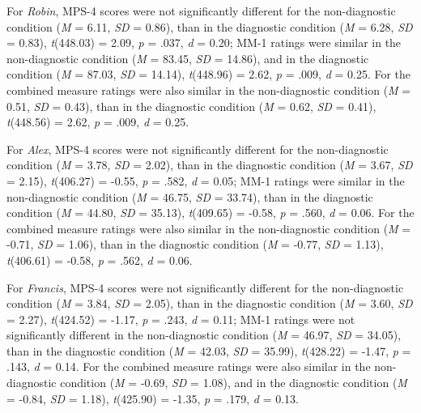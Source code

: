 \documentclass[
  american,
  man,floatsintext]{apa7}
\begin{document}
For \emph{Robin}, MPS-4 scores were not significantly different for the non-diagnostic condition (\emph{M} = 6.11, \emph{SD} = 0.86), than in the diagnostic condition (\emph{M} = 6.28, \emph{SD} = 0.83), \emph{t}(448.03) = 2.09, \emph{p} = .037, \emph{d} = 0.20; MM-1 ratings were similar in the non-diagnostic condition (\emph{M} = 83.45, \emph{SD} = 14.86), and in the diagnostic condition (\emph{M} = 87.03, \emph{SD} = 14.14), \emph{t}(448.96) = 2.62, \emph{p} = .009, \emph{d} = 0.25. For the combined measure ratings were also similar in the non-diagnostic condition (\emph{M} = 0.51, \emph{SD} = 0.43), than in the diagnostic condition (\emph{M} = 0.62, \emph{SD} = 0.41), \emph{t}(448.56) = 2.62, \emph{p} = .009, \emph{d} = 0.25.

For \emph{Alex}, MPS-4 scores were not significantly different for the non-diagnostic condition (\emph{M} = 3.78, \emph{SD} = 2.02), than in the diagnostic condition (\emph{M} = 3.67, \emph{SD} = 2.15), \emph{t}(406.27) = -0.55, \emph{p} = .582, \emph{d} = 0.05; MM-1 ratings were similar in the non-diagnostic condition (\emph{M} = 46.75, \emph{SD} = 33.74), than in the diagnostic condition (\emph{M} = 44.80, \emph{SD} = 35.13), \emph{t}(409.65) = -0.58, \emph{p} = .560, \emph{d} = 0.06. For the combined measure ratings were also similar in the non-diagnostic condition (\emph{M} = -0.71, \emph{SD} = 1.06), than in the diagnostic condition (\emph{M} = -0.77, \emph{SD} = 1.13), \emph{t}(406.61) = -0.58, \emph{p} = .562, \emph{d} = 0.06.

For \emph{Francis}, MPS-4 scores were not significantly different for the non-diagnostic condition (\emph{M} = 3.84, \emph{SD} = 2.05), than in the diagnostic condition (\emph{M} = 3.60, \emph{SD} = 2.27), \emph{t}(424.52) = -1.17, \emph{p} = .243, \emph{d} = 0.11; MM-1 ratings were not significantly different in the non-diagnostic condition (\emph{M} = 46.97, \emph{SD} = 34.05), than in the diagnostic condition (\emph{M} = 42.03, \emph{SD} = 35.99), \emph{t}(428.22) = -1.47, \emph{p} = .143, \emph{d} = 0.14. For the combined measure ratings were also similar in the non-diagnostic condition (\emph{M} = -0.69, \emph{SD} = 1.08), and in the diagnostic condition (\emph{M} = -0.84, \emph{SD} = 1.18), \emph{t}(425.90) = -1.35, \emph{p} = .179, \emph{d} = 0.13.

\newpage


\clearpage
\renewcommand{\listfigurename}{Figure captions}

\clearpage
\renewcommand{\listtablename}{Table captions}
\end{document}
